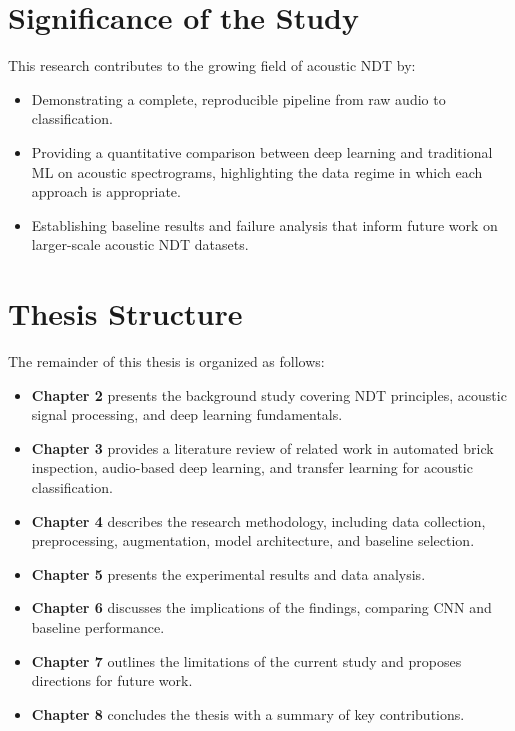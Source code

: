 \documentclass[12pt,a4paper,oneside]{report}
\begin{document}
\section{Significance of the Study}

This research contributes to the growing field of acoustic NDT by:
\begin{itemize}
    \item Demonstrating a complete, reproducible pipeline from raw audio to classification.
    \item Providing a quantitative comparison between deep learning and traditional ML on acoustic spectrograms, highlighting the data regime in which each approach is appropriate.
    \item Establishing baseline results and failure analysis that inform future work on larger-scale acoustic NDT datasets.
\end{itemize}

\newpage

\section{Thesis Structure}

The remainder of this thesis is organized as follows:
\begin{itemize}
    \item \textbf{Chapter 2} presents the background study covering NDT principles, acoustic signal processing, and deep learning fundamentals.
    \item \textbf{Chapter 3} provides a literature review of related work in automated brick inspection, audio-based deep learning, and transfer learning for acoustic classification.
    \item \textbf{Chapter 4} describes the research methodology, including data collection, preprocessing, augmentation, model architecture, and baseline selection.
    \item \textbf{Chapter 5} presents the experimental results and data analysis.
    \item \textbf{Chapter 6} discusses the implications of the findings, comparing CNN and baseline performance.
    \item \textbf{Chapter 7} outlines the limitations of the current study and proposes directions for future work.
    \item \textbf{Chapter 8} concludes the thesis with a summary of key contributions.
\end{itemize}
\end{document}
